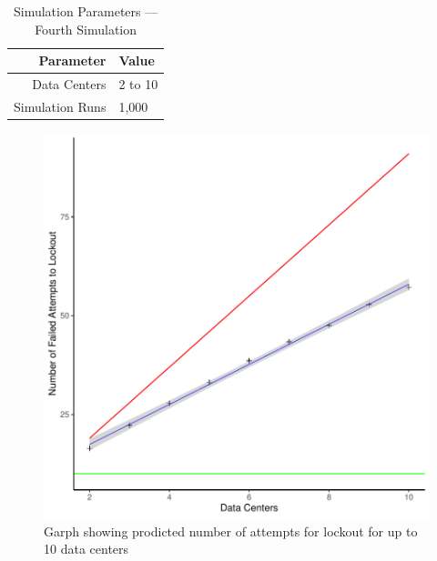 \documentclass[11pt, letterpaper]{article}
\begin{document}
\begin{table}[H]
	\centering
	\caption{Simulation Parameters --- Fourth Simulation}
	\begin{tabular}{||r|l||}
		\hline \hline
		Parameter & Value \\ \hline \hline
		Data Centers & 2 to 10 \\ \hline
		Simulation Runs & 1,000 \\ \hline \hline
	\end{tabular}
	\label{tab:Sim4_set}
\end{table}



\begin{figure}[H]
\centering
\includegraphics{Report-009}
	\caption{Garph showing prodicted number of attempts for lockout for up to 10
	data centers}
	\label{fig:plot_4}
\end{figure}
\end{document}
